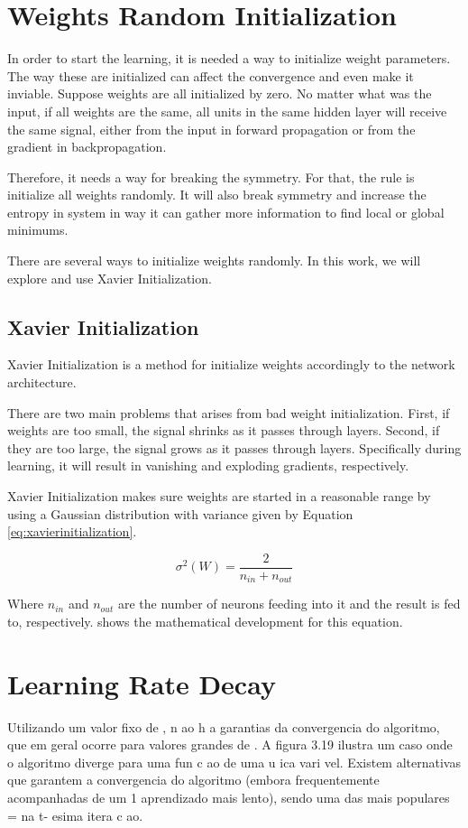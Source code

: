 \section{Weights Random Initialization}
In order to start the learning, it is needed a way to initialize weight parameters. The way these are initialized can affect the convergence and even make it inviable.
Suppose weights are all initialized by zero. No matter what was the input, if all weights are the same, all units in the same hidden layer will receive the same signal, either from the input in forward propagation or from the gradient in backpropagation. 

Therefore, it needs a way for breaking the symmetry. For that, the rule is initialize all weights randomly. It will also break symmetry and increase the entropy in system in way it can gather more information to find local or global minimums.

There are several ways to initialize weights randomly. In this work, we will explore and use Xavier Initialization.


\subsection{Xavier Initialization}

Xavier Initialization \cite{Glorot10} is a method for initialize weights accordingly to the network architecture. 

There are two main problems that arises from bad weight initialization. First, if weights are too small, the signal shrinks as it passes through layers. Second, if they are too large, the signal grows as it passes through layers. Specifically during learning, it will result in vanishing and exploding gradients, respectively.

Xavier Initialization makes sure weights are started in a reasonable range by using a Gaussian distribution with variance given by Equation \ref{eq:xavierinitialization}.

\begin{equation}\label{eq:xavierinitialization}
	\sigma^{2}(W) = \frac{2}{n_{in} + n_{out}}
\end{equation}

Where $n_{in}$ and $n_{out}$ are the number of neurons feeding into it and the result is fed to, respectively. \cite{Glorot10} shows the mathematical development for this equation.

\section{Learning Rate Decay}

Utilizando um valor fixo de , n ao h a garantias da convergencia do
algoritmo, que em geral ocorre para valores grandes de . A figura 3.19 ilustra um caso
onde o algoritmo diverge para uma fun c ao de uma u
ica vari vel. Existem alternativas
que garantem a convergencia do algoritmo (embora frequentemente acompanhadas de um
1
aprendizado mais lento), sendo uma das mais populares  = na t- esima itera c ao.
